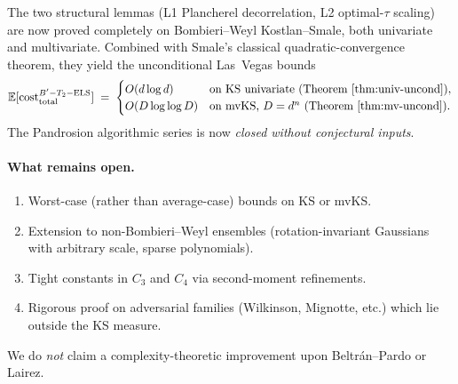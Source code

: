 \documentclass[11pt,a4paper]{article}
\begin{document}
The two structural lemmas (L1 Plancherel decorrelation, L2 optimal-$\tau$ scaling) are now proved completely on Bombieri--Weyl Kostlan--Smale, both univariate and multivariate. Combined with Smale's classical quadratic-convergence theorem, they yield the unconditional Las~Vegas bounds
\begin{equation*}
\mathbb E[\mathrm{cost}^{B'-T_2-\text{ELS}}_{\text{total}}] \;=\;
\begin{cases}
O(d \log d) & \text{on KS univariate (Theorem~\ref{thm:univ-uncond})},\\
O(D \log\log D) & \text{on mvKS, } D = d^n \text{ (Theorem~\ref{thm:mv-uncond})}.
\end{cases}
\end{equation*}
The Pandrosion algorithmic series is now \emph{closed without conjectural inputs}.

\paragraph{What remains open.}
\begin{enumerate}
\item Worst-case (rather than average-case) bounds on KS or mvKS.
\item Extension to non-Bombieri--Weyl ensembles (rotation-invariant Gaussians with arbitrary scale, sparse polynomials).
\item Tight constants in $C_3$ and $C_4$ via second-moment refinements.
\item Rigorous proof on adversarial families (Wilkinson, Mignotte, etc.) which lie outside the KS measure.
\end{enumerate}

We do \emph{not} claim a complexity-theoretic improvement upon Beltr\'an--Pardo or Lairez.
\end{document}
